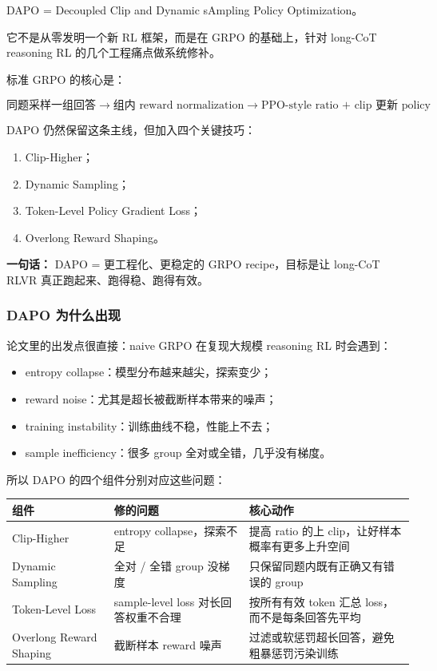 DAPO = Decoupled Clip and Dynamic sAmpling Policy Optimization。

它不是从零发明一个新 RL 框架，而是在 GRPO 的基础上，针对 long-CoT reasoning RL 的几个工程痛点做系统修补。

标准 GRPO 的核心是：

\[
\text{同题采样一组回答}
\to
\text{组内 reward normalization}
\to
\text{PPO-style ratio + clip 更新 policy}
\]

DAPO 仍然保留这条主线，但加入四个关键技巧：

\begin{enumerate}[leftmargin=1.5em]
  \item Clip-Higher；
  \item Dynamic Sampling；
  \item Token-Level Policy Gradient Loss；
  \item Overlong Reward Shaping。
\end{enumerate}

\begin{summarybox}
\textbf{一句话：} DAPO = 更工程化、更稳定的 GRPO recipe，目标是让 long-CoT RLVR 真正跑起来、跑得稳、跑得有效。
\end{summarybox}

\subsubsection{DAPO 为什么出现}

论文里的出发点很直接：naive GRPO 在复现大规模 reasoning RL 时会遇到：

\begin{itemize}[leftmargin=1.5em]
  \item entropy collapse：模型分布越来越尖，探索变少；
  \item reward noise：尤其是超长被截断样本带来的噪声；
  \item training instability：训练曲线不稳，性能上不去；
  \item sample inefficiency：很多 group 全对或全错，几乎没有梯度。
\end{itemize}

所以 DAPO 的四个组件分别对应这些问题：

\begin{center}
{\small
\begin{tabular}{p{3.6cm}p{4.2cm}p{5cm}}
\hline
\textbf{组件} & \textbf{修的问题} & \textbf{核心动作} \\
\hline
Clip-Higher
&
entropy collapse，探索不足
&
提高 ratio 的上 clip，让好样本概率有更多上升空间
\\
Dynamic Sampling
&
全对 / 全错 group 没梯度
&
只保留同题内既有正确又有错误的 group
\\
Token-Level Loss
&
sample-level loss 对长回答权重不合理
&
按所有有效 token 汇总 loss，而不是每条回答先平均
\\
Overlong Reward Shaping
&
截断样本 reward 噪声
&
过滤或软惩罚超长回答，避免粗暴惩罚污染训练
\\
\hline
\end{tabular}
}
\end{center}

